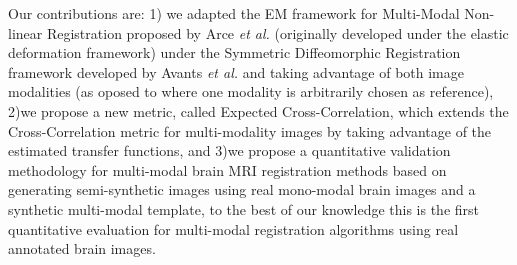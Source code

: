 Our contributions are: 1) we adapted the EM framework for Multi-Modal Non-linear Registration proposed by Arce {\it et al.}\cite{Arce-santana2014} (originally
developed under the elastic deformation framework) under the Symmetric Diffeomorphic Registration framework developed by Avants {\it et al.}\cite{Avants2008}
\cite{Avants2011} and taking advantage of both image modalities (as oposed to \cite{Arce-santana2014} where one modality is arbitrarily chosen as reference),
2)we propose a new metric, called Expected Cross-Correlation, which extends the Cross-Correlation metric for multi-modality images by taking
advantage of the estimated transfer functions, and 3)we propose a quantitative validation methodology for multi-modal brain MRI registration methods
based on generating semi-synthetic images using real mono-modal brain images and a synthetic multi-modal template, to the best of our knowledge this is the first
quantitative evaluation for multi-modal registration algorithms using real annotated brain images.\\
